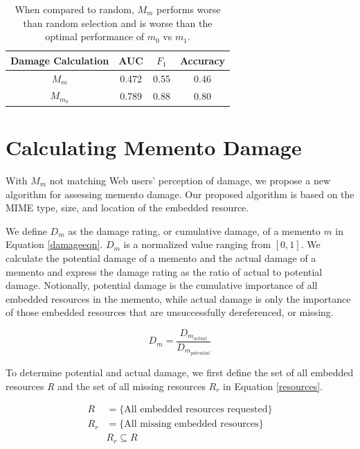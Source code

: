 \begin{table}
\centering
\begin{tabular}{ c | c | c | c }
    Damage Calculation &  AUC & $F_1$ & Accuracy\\
\hline
  $M_m$ & 0.472 & 0.55 & 0.46\\
  $M_{m_0}$ & 0.789 & 0.88 & 0.80 \\
\hline
\end{tabular}
  \caption{When compared to random, $M_m$ performs worse than random selection and is worse than the optimal performance of $m_0$ vs $m_1$.}
  \label{auc1}
\end{table}




\section{Calculating Memento Damage}
\label{damage}
With $M_m$ not matching Web users' perception of damage, we propose a new algorithm for assessing memento damage. Our proposed algorithm is based on the MIME type, size, and location of the embedded resource.

We define $D_m$ as the damage rating, or cumulative damage, of a memento $m$ in Equation \ref{damageeqn}. $D_m$ is a normalized value ranging from $[0,1]$. We calculate the potential damage of a memento and the actual damage of a memento and express the damage rating as the ratio of actual to potential damage. Notionally, potential damage is the cumulative importance of all embedded resources in the memento, while actual damage is only the importance of those embedded resources that are unsuccessfully dereferenced, or missing.

\begin{equation}
\label{damageeqn}
D_m = \frac{D_{m_{actual}}}{D_{m_{potential}}}
\end{equation}

To determine potential and actual damage, we first define the set of all embedded resources \emph{R} and the set of all missing resources \emph{$R_r$} in Equation \ref{resources}.

\begin{equation}
\label{resources}
\begin{split}
R &= \{\text{All embedded resources requested}\}\\
R_r &= \{\text{All missing embedded resources}\}\\
&R_r \subseteq R
\end{split}
\end{equation}

